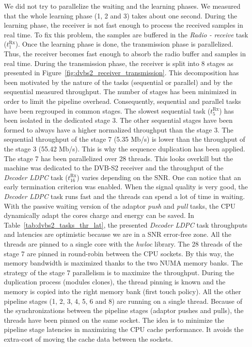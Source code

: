 We did not try to parallelize the waiting and the learning phases. We measured
that the whole learning phase (1, 2 and 3) takes about one second. During the
learning phase, the receiver is not fast enough to process the received samples
in real time. To fix this problem, the samples are buffered in the \emph{Radio -
receive} task ($t^\text{Rx}_{1}$). Once the learning phase is done, the
transmission phase is parallelized. Thus, the receiver becomes fast enough to
absorb the radio buffer and samples in real time. During the transmission phase,
the receiver is split into 8 stages as presented in
Figure~\ref{fig:dvbs2_receiver_transmission}. This decomposition has been
motivated by the nature of the tasks (sequential or parallel) and by the
sequential measured throughput. The number of stages has been minimized in order
to limit the pipeline overhead. Consequently, sequential and parallel tasks
have been regrouped in common stages. The slowest sequential task
($t^\text{Rx}_{5}$) has been isolated in the dedicated stage 3. The other
sequential stages have been formed to always have a higher normalized throughput
than the stage 3. The sequential throughput of the stage 7 (5.35 Mb/s) is lower
than the throughput of the stage 3 (55.42 Mb/s). This is why the sequence
duplication has been applied. The stage 7 has been parallelized over 28 threads.
This looks overkill but the machine was dedicated to the DVB-S2 receiver
and the throughput of the \emph{Decoder LDPC} task ($t^\text{Rx}_{16}$) varies
depending on the SNR. One can notice that an early termination criterion was
enabled. When the signal quality is very good, the \emph{Decoder LDPC} task runs
fast and the threads can spend a lot of time in waiting. With the passive
waiting version of the adaptor \emph{push} and \emph{pull} tasks, the CPU
dynamically adapt the cores charge and energy can be saved. In
Table~\ref{tab:dvbs2_tasks_thr_lat}, the presented \emph{Decoder LDPC} task
throughputs and latencies are optimistic because we are in a SNR error-free
zone. All the threads are pinned to a single core with the \emph{hwloc} library.
The 28 threads of the stage 7 are pinned in round-robin between the CPU sockets.
By this way, the memory bandwidth is maximized thanks to the two NUMA memory
banks. The strategy of the stage 7 parallelism is to maximize the throughput.
During the duplication process (modules clones), the thread pinning is known and
the memory is copied into the right memory bank (first touch policy). All the
other pipeline stages (1, 2, 3, 4, 5, 6 and 8) are running on a single thread.
Because of the synchronizations between the pipeline stages (adaptor pushes and
pulls), the threads have been pinned on the same socket. The idea is to minimize
the pipeline stage latencies in maximizing the CPU cache performance. It avoids
the extra-cost of moving the cache data between the sockets.


